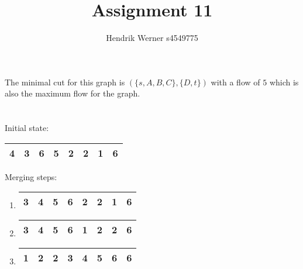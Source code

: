\documentclass[12pt, a4paper]{article}
\title{Assignment 11}
\author{Hendrik Werner s4549775}
\begin{document}
\maketitle

\section{} %
The minimal cut for this graph is $(\{s, A, B, C\}, \{D, t\})$ with a flow of $5$ which is also the maximum flow for the graph.

\section{} %

\section{} %

\section{} %

Initial state:

\begin{tabular}{|c|c|c|c|c|c|c|c|}
	\hline
	4 & 3 & 6 & 5 & 2 & 2 & 1 & 6\\
	\hline
\end{tabular}

Merging steps:

\begin{enumerate}
	\item \begin{tabular}{|c|c|c|c|c|c|c|c|}
		\hline
		3 & 4 & 5 & 6 & 2 & 2 & 1 & 6\\
		\hline
	\end{tabular}
	\item \begin{tabular}{|c|c|c|c|c|c|c|c|}
		\hline
		3 & 4 & 5 & 6 & 1 & 2 & 2 & 6\\
		\hline
	\end{tabular}
	\item \begin{tabular}{|c|c|c|c|c|c|c|c|}
		\hline
		1 & 2 & 2 & 3 & 4 & 5 & 6 & 6\\
		\hline
	\end{tabular}
\end{enumerate}

\section{} %
\end{document}
